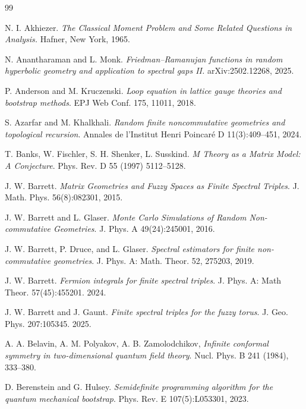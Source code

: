 \documentclass[11pt]{article}
\theoremstyle{plain}
\begin{document}
\begin{thebibliography}{99}




 N. I. Akhiezer. {\it The Classical Moment Problem and Some Related Questions in Analysis.}
Hafner, New York,  1965.


 N. Anantharaman and L. Monk. {\it Friedman–Ramanujan functions in random hyperbolic geometry and application to spectral gaps II.}  	arXiv:2502.12268,  2025.


P. Anderson and M. Kruczenski. \emph{Loop equation in lattice gauge theories and bootstrap methods}. EPJ Web Conf. 175, 11011, 2018.

S. Azarfar and M. Khalkhali. \emph{Random finite noncommutative geometries and topological recursion}. Annales de l’Institut Henri Poincaré D 11(3):409–451, 2024.

T. Banks, W. Fischler, S. H. Shenker, L. Susskind.
\emph{M Theory as a Matrix Model: A Conjecture}. Phys. Rev. D 55 (1997) 5112–5128.

J. W. Barrett. \emph{Matrix Geometries and Fuzzy Spaces as Finite Spectral Triples}. J. Math. Phys. 56(8):082301, 2015.

J. W. Barrett and L. Glaser. \emph{Monte Carlo Simulations of Random Non-commutative Geometries}. J. Phys. A 49(24):245001, 2016.

J. W. Barrett, P. Druce, and L. Glaser. \emph{Spectral estimators for finite non-commutative geometries}. J. Phys. A: Math. Theor. 52, 275203, 2019.



J. W. Barrett. \emph{Fermion integrals for finite spectral triples}. J. Phys. A: Math Theor. 57(45):455201. 2024.

J. W. Barrett and J. Gaunt. \emph{Finite spectral triples for the fuzzy torus}. J. Geo. Phys. 207:105345. 2025.


A. A. Belavin, A. M. Polyakov, A. B. Zamolodchikov,
\emph{Infinite conformal symmetry in two-dimensional quantum field theory}.
Nucl. Phys. B 241 (1984), 333--380.



D. Berenstein and G. Hulsey. \emph{Semidefinite programming algorithm for the quantum mechanical bootstrap}. Phys. Rev. E 107(5):L053301, 2023.


\end{thebibliography}
\end{document}
